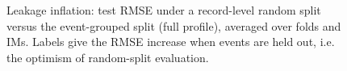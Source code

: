 \begin{figure}[htbp]
\centering
{}
\caption{Leakage inflation: test RMSE under a record-level random split versus the event-grouped split (full profile), averaged over folds and IMs. Labels give the RMSE increase when events are held out, i.e. the optimism of random-split evaluation.}
\label{fig:figS1_random_leakage_inflation}
\end{figure}
